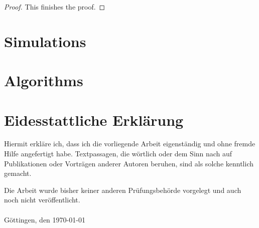 \documentclass[a4paper,12pt]{article}
\theoremstyle{plain}
\theoremstyle{definition}
\numberwithin{equation}{section}
\begin{document}
\begin{appendix}
\begin{proof}
		This finishes the proof.
	\end{proof}
	
	\newpage
	
	\section{Simulations}\label{appendix: simulations}
	
	
	
	
	
	
	
	
	
	
	
	
	
	
	
	\newpage
	
	\section{Algorithms}\label{appendix: algorithms}
	
	
	
	\newpage
	
	
	
	\newpage
	
	
	
	\newpage
	
	
\end{appendix}


\newpage

\section*{Eidesstattliche Erklärung}
Hiermit erkläre ich, dass ich die vorliegende Arbeit eigenständig und ohne fremde Hilfe angefertigt habe. Textpassagen, die wörtlich oder dem Sinn nach auf Publikationen oder Vorträgen anderer Autoren beruhen, sind als solche kenntlich gemacht.

Die Arbeit wurde bisher keiner anderen Prüfungsbehörde vorgelegt und auch noch nicht veröffentlicht.\\\\

\noindent Göttingen, den \today

\end{document}
